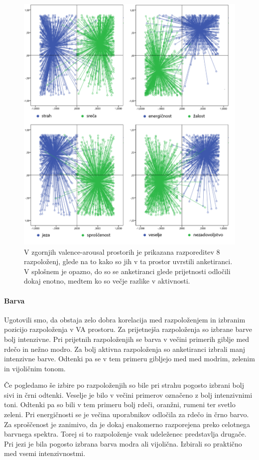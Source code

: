 \documentclass[a4paper, 12pt]{book}
\begin{document}
{\begin{figure}[!hbt]
\centering
\includegraphics[width=12cm]{images/vamoodlables.png}

\caption{V zgornjih valence-arousal prostorih je prikazana razporeditev 8 razpoloženj, glede na to kako so jih v ta prostor uvrstili anketiranci. V splošnem je opazno, do so se anketiranci glede prijetnosti odločili dokaj enotno, medtem ko so večje razlike v aktivnosti.}
\label{moodperception}
\end{figure} 

\paragraph{Barva}

Ugotovili smo, da obstaja zelo dobra korelacija med razpoloženjem in izbranim pozicijo razpoloženja v VA prostoru. Za prijetnejša razpoloženja so izbrane barve bolj intenzivne. Pri prijetnih razpoloženjih se barva v večini primerih giblje med rdečo in nežno modro. Za bolj aktivna razpoloženja so anketiranci izbrali manj intenzivne barve. Odtenki pa se v tem primeru gibljejo med med modrim, zelenim in vijoličnim tonom. 

Če pogledamo še izbire po razpoloženjih so bile pri strahu pogosto izbrani bolj sivi in črni odtenki. Veselje je bilo v večini primerov označeno z bolj intenzivnimi toni. Odtenki pa so bili v tem primeru bolj rdeči, oranžni, rumeni ter svetlo zeleni. Pri energičnosti se je večina uporabnikov odločila za rdečo in črno barvo. Za sproščenost je zanimivo, da je dokaj enakomerno razporejena preko celotnega barvnega spektra. Torej si to razpoloženje vsak udeleženec predstavlja drugače. Pri jezi je bila pogosto izbrana barva modra ali vijolična. Izbirali so praktično med vsemi intenzivnostmi.

}
\end{document}
